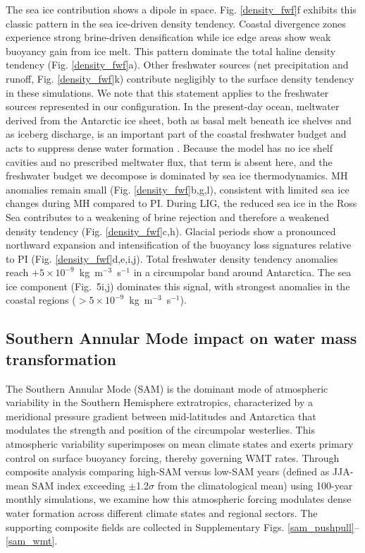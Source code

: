 \documentclass[pdflatex,sn-nature]{sn-jnl}
\begin{document}
The sea ice contribution shows a dipole in space. Fig. \ref{density_fwf}f exhibits this classic pattern in the sea ice-driven density tendency.  Coastal divergence zones experience strong brine-driven densification while ice edge areas show weak buoyancy gain from ice melt. This pattern dominate the total haline density tendency (Fig. \ref{density_fwf}a). Other freshwater sources (net precipitation and runoff, Fig. \ref{density_fwf}k) contribute negligibly to the surface density tendency in these simulations. We note that this statement applies to the freshwater sources represented in our configuration. In the present-day ocean, meltwater derived from the Antarctic ice sheet, both as basal melt beneath ice shelves and as iceberg discharge, is an important part of the coastal freshwater budget and acts to suppress dense water formation \cite{Silvano2018,ToggweilerSamuels1995}. Because the model has no ice shelf cavities and no prescribed meltwater flux, that term is absent here, and the freshwater budget we decompose is dominated by sea ice thermodynamics.
MH anomalies remain small (Fig. \ref{density_fwf}b,g,l), consistent with limited sea ice changes during MH compared to PI. During LIG, the reduced sea ice in the Ross Sea contributes to a weakening of brine rejection and therefore a weakened density tendency (Fig. \ref{density_fwf}c,h).
Glacial periods show a pronounced northward expansion and intensification of the buoyancy loss signatures relative to PI (Fig. \ref{density_fwf}d,e,i,j). Total freshwater density tendency anomalies reach $+5 \times 10^{-9}$~kg~m$^{-3}$~s$^{-1}$ in a circumpolar band around Antarctica. The sea ice component (Fig.~5i,j) dominates this signal, with strongest anomalies in the coastal regions ($> 5 \times 10^{-9}$~kg~m$^{-3}$~s$^{-1}$).


\subsection{Southern Annular Mode impact on water mass transformation}


The Southern Annular Mode (SAM) is the dominant mode of atmospheric variability in the Southern Hemisphere extratropics, characterized by a meridional pressure gradient between mid-latitudes and Antarctica that modulates the strength and position of the circumpolar westerlies. This atmospheric variability superimposes on mean climate states   and exerts primary control on surface buoyancy forcing, thereby governing WMT rates. Through composite analysis comparing high-SAM versus low-SAM years (defined as JJA-mean SAM index exceeding $\pm$1.2$\sigma$ from the climatological mean) using 100-year monthly simulations, we examine how this atmospheric forcing modulates dense water formation across different climate states and regional sectors. The supporting composite fields are collected in Supplementary Figs. \ref{sam_pushpull}--\ref{sam_wmt}.
\end{document}
